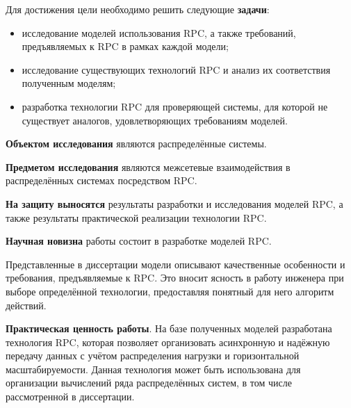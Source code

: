 Для достижения цели необходимо решить следующие \textbf{задачи}:
\begin{itemize}
    \item исследование моделей использования RPC, а также требований,
        предъявляемых к RPC в рамках каждой модели;
    \item исследование существующих технологий RPC и анализ их соответствия
        полученным моделям;
    \item разработка технологии RPC для проверяющей системы, для которой
        не существует аналогов, удовлетворяющих требованиям моделей.
\end{itemize}

\textbf{Объектом исследования} являются распределённые системы.

\textbf{Предметом исследования} являются межсетевые взаимодействия в распределённых
системах посредством RPC.

\textbf{На защиту выносятся} результаты разработки и исследования моделей RPC,
а также результаты практической реализации технологии RPC.

\textbf{Научная новизна} работы состоит в разработке моделей RPC.

Представленные в диссертации модели описывают качественные особенности
и требования, предъявляемые к RPC. Это вносит ясность в работу инженера
при выборе определённой технологии, предоставляя понятный для него
алгоритм действий.

\textbf{Практическая ценность работы}. На базе полученных моделей
разработана технология RPC, которая позволяет организовать асинхронную
и надёжную передачу данных с учётом распределения нагрузки и горизонтальной
масштабируемости. Данная технология может быть использована для организации
вычислений ряда распределённых систем, в том числе рассмотренной в диссертации.
